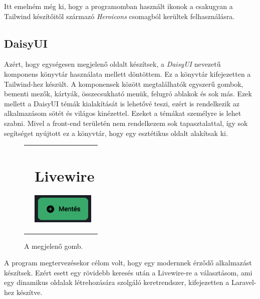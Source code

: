 \documentclass[
]{thesis-ekf}
\theoremstyle{definition}
\theoremstyle{remark}
\begin{document}
Itt emelném még ki, hogy a programomban használt ikonok a csakugyan a Tailwind készítőitől származó \emph{Heroicons}\cite{heroicons} csomagból kerültek felhasználásra.

\subsection{DaisyUI}

Azért, hogy egységesen megjelenő oldalt készítsek, a \emph{DaisyUI}\cite{daisyui} nevezetű komponens könyvtár használata mellett döntöttem. Ez a könyvtár kifejezetten a Tailwind-hez készült. A komponensek között megtalálhatók egyszerű gombok, bementi mezők, kártyák, összecsukható menük, felugró ablakok és sok más. Ezek mellett a DaisyUI témák kialakítását is lehetővé teszi, ezért is rendelkezik az alkalmazásom sötét és világos kinézettel. Ezeket a témákat személyre is lehet szabni. Mivel a front-end területén nem rendelkezem sok tapasztalattal, így sok segítséget nyújtott ez a könyvtár, hogy egy esztétikus oldalt alakítsak ki.

\begin{figure}[ht!]
	\begin{tabular}{p{}p{}}
		\begin{minipage}{.6\textwidth}
			
		\end{minipage}
		&
		\section{Livewire}
		\label{livewireSection}
		\begin{minipage}{.4\textwidth}
			\centering
			\caption{A megjelenő gomb.}
			\includegraphics[width=3cm]{../pictures/screenshots/button.png}
			\label{button}
		\end{minipage}
		
	\end{tabular}
\end{figure}


A program megtervezésekor célom volt, hogy egy modernnek érződő alkalmazást készítsek. Ezért esett egy rövidebb keresés után a Livewire-re a választásom, ami egy dinamikus oldalak létrehozására szolgáló keretrendszer, kifejezetten a Laravel-hez készítve.\cite{livewire}
\end{document}
